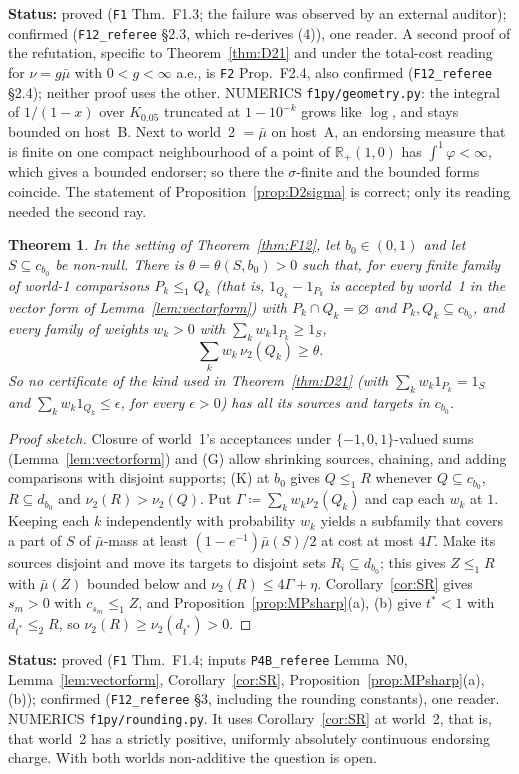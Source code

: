 \documentclass[11pt]{article}
\newtheorem{theorem}{Theorem}[section]
\theoremstyle{definition}
\theoremstyle{remark}
\newcommand{\R}{\mathbb R}
\newcommand{\src}[1]{\texttt{#1}}
\newcommand{\status}[1]{\par\smallskip\noindent\textbf{Status:} #1\par\smallskip}
\begin{document}
\status{proved (\src{F1} Thm.~F1.3; the failure was observed by an external auditor); confirmed (\src{F12\_referee} \S2.3, which re-derives (4)), one reader. A second proof of the refutation, specific to Theorem~\ref{thm:D21} and under the total-cost reading for $\nu=g\bar\mu$ with $0<g<\infty$ a.e., is \src{F2} Prop.~F2.4, also confirmed (\src{F12\_referee} \S2.4); neither proof uses the other. NUMERICS \src{f1py/geometry.py}: the integral of $1/(1-x)$ over $K_{0.05}$ truncated at $1-10^{-k}$ grows like $\log$, and stays bounded on host~B. Next to world~2 $=\bar\mu$ on host~A, an endorsing measure that is finite on one compact neighbourhood of a point of $\R_+(1,0)$ has $\int^1\varphi<\infty$, which gives a bounded endorser; so there the $\sigma$-finite and the bounded forms coincide. The statement of Proposition~\ref{prop:D2sigma} is correct; only its reading needed the second ray.}

\begin{theorem}\label{thm:F14}
In the setting of Theorem~\ref{thm:F12}, let $b_0\in(0,1)$ and let $S\subseteq c_{b_0}$ be non-null. There is $\theta=\theta(S,b_0)>0$ such that, for every finite family of world-1 comparisons $P_k\le_1Q_k$ (that is, $1_{Q_k}-1_{P_k}$ is accepted by world~1 in the vector form of Lemma~\ref{lem:vectorform}) with $P_k\cap Q_k=\varnothing$ and $P_k,Q_k\subseteq c_{b_0}$, and every family of weights $w_k>0$ with $\sum_kw_k1_{P_k}\ge1_S$,
\[
\sum_kw_k\,\nu_2(Q_k)\ge\theta.
\]
So no certificate of the kind used in Theorem~\ref{thm:D21} (with $\sum_kw_k1_{P_k}=1_S$ and $\sum_kw_k1_{Q_k}\le\epsilon$, for every $\epsilon>0$) has all its sources and targets in $c_{b_0}$.
\end{theorem}
\begin{proof}[Proof sketch]
Closure of world~1's acceptances under $\{-1,0,1\}$-valued sums (Lemma~\ref{lem:vectorform}) and (G) allow shrinking sources, chaining, and adding comparisons with disjoint supports; (K) at $b_0$ gives $Q\le_1R$ whenever $Q\subseteq c_{b_0}$, $R\subseteq d_{b_0}$ and $\nu_2(R)>\nu_2(Q)$. Put $\Gamma\coloneqq\sum_kw_k\nu_2(Q_k)$ and cap each $w_k$ at $1$. Keeping each $k$ independently with probability $w_k$ yields a subfamily that covers a part of $S$ of $\bar\mu$-mass at least $(1-e^{-1})\bar\mu(S)/2$ at cost at most $4\Gamma$. Make its sources disjoint and move its targets to disjoint sets $R_i\subseteq d_{b_0}$; this gives $Z\le_1R$ with $\bar\mu(Z)$ bounded below and $\nu_2(R)\le4\Gamma+\eta$. Corollary~\ref{cor:SR} gives $s_m>0$ with $c_{s_m}\le_1Z$, and Proposition~\ref{prop:MPsharp}(a), (b) give $t^*<1$ with $d_{t^*}\le_2R$, so $\nu_2(R)\ge\nu_2(d_{t^*})>0$.
\end{proof}
\status{proved (\src{F1} Thm.~F1.4; inputs \src{P4B\_referee} Lemma~N0, Lemma~\ref{lem:vectorform}, Corollary~\ref{cor:SR}, Proposition~\ref{prop:MPsharp}(a), (b)); confirmed (\src{F12\_referee} \S3, including the rounding constants), one reader. NUMERICS \src{f1py/rounding.py}. It uses Corollary~\ref{cor:SR} at world~2, that is, that world~2 has a strictly positive, uniformly absolutely continuous endorsing charge. With both worlds non-additive the question is open.}
\end{document}
